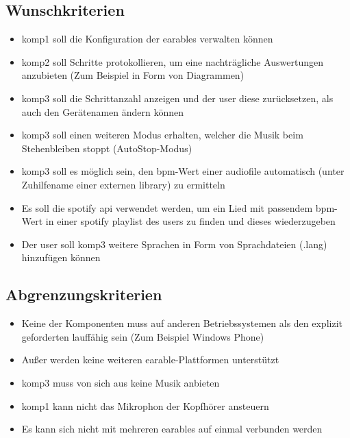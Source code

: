 \documentclass[../pflichtenheft.tex]{subfiles}
\begin{document}
	\subsection{Wunschkriterien}
		\begin{itemize}
			\item \Gls{komp1} soll die Konfiguration der \Gls{earable}s verwalten können
			\item \Gls{komp2} soll Schritte protokollieren, um eine nachträgliche Auswertungen anzubieten (Zum Beispiel in Form von Diagrammen)	
			\item \Gls{komp3} soll die Schrittanzahl anzeigen und der \Gls{user} diese zurücksetzen, als auch den Gerätenamen ändern können
			\item \Gls{komp3} soll einen weiteren Modus erhalten, welcher die Musik beim Stehenbleiben stoppt (AutoStop-Modus)
			\item \Gls{komp3} soll es möglich sein, den \Gls{bpm}-Wert einer \gls{audiofile} automatisch (unter Zuhilfename einer externen \Gls{library}) zu ermitteln
			\item Es soll die \Gls{spotify} \Gls{api} verwendet werden, um ein Lied mit passendem \Gls{bpm}-Wert in einer \Gls{spotify} \Gls{playlist} des \Gls{user}s zu finden und dieses wiederzugeben
			\item Der \Gls{user} soll \Gls{komp3} weitere Sprachen in Form von Sprachdateien (.lang) hinzufügen können
		\end{itemize}
	\subsection{Abgrenzungskriterien}
		\begin{itemize}
			\item Keine der Komponenten muss auf anderen Betriebssystemen als den explizit geforderten lauffähig sein (Zum Beispiel Windows Phone)
			\item Außer  werden keine weiteren \Gls{earable}-Plattformen unterstützt
			\item \Gls{komp3} muss von sich aus keine Musik anbieten
			\item \Gls{komp1} kann nicht das Mikrophon der Kopfhörer ansteuern
			\item Es kann sich nicht mit mehreren \Gls{earable}s auf einmal verbunden werden
		\end{itemize}
\end{document}
